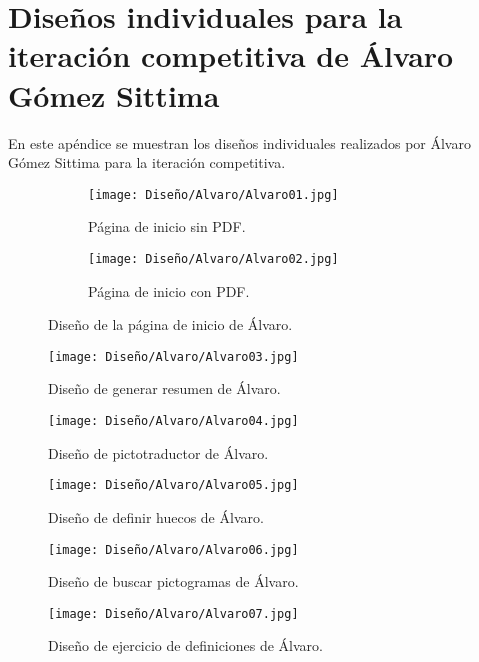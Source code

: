 \chapter{Diseños individuales para la iteración competitiva de Álvaro Gómez Sittima}
\label{ape:disenyoAlvaro}
En este apéndice se muestran los diseños individuales realizados por Álvaro Gómez Sittima para la iteración competitiva.

\begin{figure}[ht!]
  \centering

  \begin{subfigure}{\textwidth}
    \centering
    \texttt{[image: Diseño/Alvaro/Alvaro01.jpg]}
    \caption{Página de inicio sin PDF.}
    \label{fig:disenyoAlvaro01a}
  \end{subfigure}

  \begin{subfigure}{\textwidth}
    \centering
    \texttt{[image: Diseño/Alvaro/Alvaro02.jpg]}
    \caption{Página de inicio con PDF.}
    \label{fig:disenyoAlvaro01b}
  \end{subfigure}

  \caption{Diseño de la página de inicio de Álvaro.}
  \label{fig:disenyoAlvaro01}
\end{figure}

\begin{figure}[ht!]
  \centering
  \texttt{[image: Diseño/Alvaro/Alvaro03.jpg]}
  \caption{Diseño de generar resumen de Álvaro.}
  \label{fig:disenyoAlvaro02}
\end{figure}

\begin{figure}[ht!]
  \centering
  \texttt{[image: Diseño/Alvaro/Alvaro04.jpg]}
  \caption{Diseño de pictotraductor de Álvaro.}
  \label{fig:disenyoAlvaro03}
\end{figure}

\begin{figure}[ht!]
  \centering
  \texttt{[image: Diseño/Alvaro/Alvaro05.jpg]}
  \caption{Diseño de definir huecos de Álvaro.}
  \label{fig:disenyoAlvaro04}
\end{figure}

\begin{figure}[ht!]
  \centering
  \texttt{[image: Diseño/Alvaro/Alvaro06.jpg]}
  \caption{Diseño de buscar pictogramas de Álvaro.}
  \label{fig:disenyoAlvaro05}
\end{figure}

\begin{figure}[ht!]
  \centering
  \texttt{[image: Diseño/Alvaro/Alvaro07.jpg]}
  \caption{Diseño de ejercicio de definiciones de Álvaro.}
  \label{fig:disenyoAlvaro06}
\end{figure}
